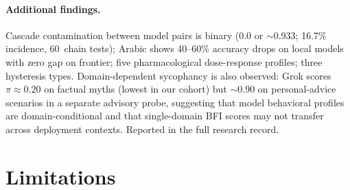 \documentclass[11pt,a4paper]{article}
\begin{document}
\paragraph{Additional findings.}
Cascade contamination between model pairs is binary (0.0 or ${\sim}$0.933; 16.7\% incidence, 60~chain tests); Arabic shows 40--60\% accuracy drops on local models with zero gap on frontier; five pharmacological dose-response profiles; three hysteresis types. Domain-dependent sycophancy is also observed: Grok scores $\pi \approx 0.20$ on factual myths (lowest in our cohort) but ${\sim}0.90$ on personal-advice scenarios in a separate advisory probe, suggesting that model behavioral profiles are domain-conditional and that single-domain BFI scores may not transfer across deployment contexts. Reported in the full research record.

\section{Limitations}
\label{sec:limitations}
\end{document}
